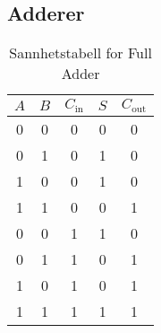\subsection{Adderer}
\begin{table}[H]
    \centering
    \begin{tabular}{|c|c|c|c|c|}
    \hline
    \(A\) & \(B\) & \(C_{\text{in}}\) & \(S\) & \(C_{\text{out}}\) \\
    \hline
    0 & 0 & 0 & 0 & 0 \\
    0 & 1 & 0 & 1 & 0 \\
    1 & 0 & 0 & 1 & 0 \\
    1 & 1 & 0 & 0 & 1 \\
    0 & 0 & 1 & 1 & 0 \\
    0 & 1 & 1 & 0 & 1 \\
    1 & 0 & 1 & 0 & 1 \\
    1 & 1 & 1 & 1 & 1 \\
    \hline
    \end{tabular}
    \caption{Sannhetstabell for Full Adder}
    \end{table}
    
    
